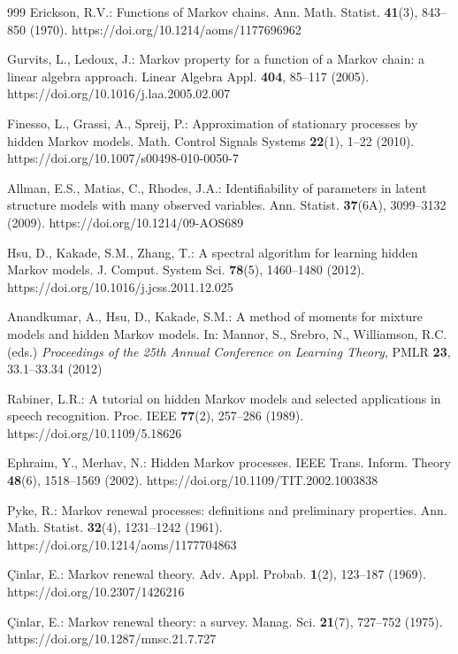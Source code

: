 \begin{thebibliography}{999}
Erickson, R.V.: Functions of Markov chains. Ann. Math. Statist. \textbf{41}(3), 843--850 (1970). https://doi.org/10.1214/aoms/1177696962

Gurvits, L., Ledoux, J.: Markov property for a function of a Markov chain: a linear algebra approach. Linear Algebra Appl. \textbf{404}, 85--117 (2005). https://doi.org/10.1016/j.laa.2005.02.007

Finesso, L., Grassi, A., Spreij, P.: Approximation of stationary processes by hidden Markov models. Math. Control Signals Systems \textbf{22}(1), 1--22 (2010). https://doi.org/10.1007/s00498-010-0050-7

Allman, E.S., Matias, C., Rhodes, J.A.: Identifiability of parameters in latent structure models with many observed variables. Ann. Statist. \textbf{37}(6A), 3099--3132 (2009). https://doi.org/10.1214/09-AOS689

Hsu, D., Kakade, S.M., Zhang, T.: A spectral algorithm for learning hidden Markov models. J. Comput. System Sci. \textbf{78}(5), 1460--1480 (2012). https://doi.org/10.1016/j.jcss.2011.12.025

Anandkumar, A., Hsu, D., Kakade, S.M.: A method of moments for mixture models and hidden Markov models. In: Mannor, S., Srebro, N., Williamson, R.C. (eds.) \emph{Proceedings of the 25th Annual Conference on Learning Theory}, PMLR \textbf{23}, 33.1--33.34 (2012)

Rabiner, L.R.: A tutorial on hidden Markov models and selected applications in speech recognition. Proc. IEEE \textbf{77}(2), 257--286 (1989). https://doi.org/10.1109/5.18626

Ephraim, Y., Merhav, N.: Hidden Markov processes. IEEE Trans. Inform. Theory \textbf{48}(6), 1518--1569 (2002). https://doi.org/10.1109/TIT.2002.1003838

Pyke, R.: Markov renewal processes: definitions and preliminary properties.
Ann. Math. Statist. \textbf{32}(4), 1231--1242 (1961).
https://doi.org/10.1214/aoms/1177704863

{\c C}inlar, E.: Markov renewal theory. Adv. Appl. Probab. \textbf{1}(2),
123--187 (1969). https://doi.org/10.2307/1426216

{\c C}inlar, E.: Markov renewal theory: a survey. Manag. Sci. \textbf{21}(7),
727--752 (1975). https://doi.org/10.1287/mnsc.21.7.727


\end{thebibliography}
